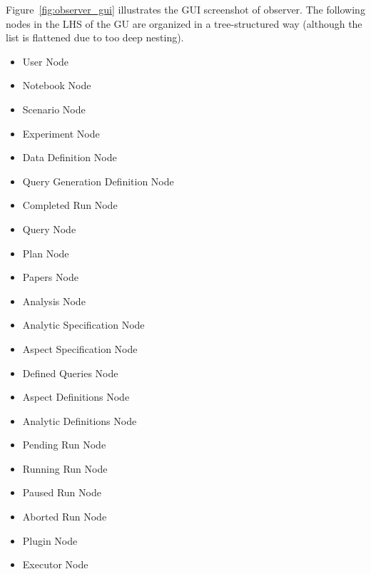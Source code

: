 \documentclass[conference]{IEEEtran}
\begin{document}
Figure~\ref{fig:observer_gui} illustrates the GUI screenshot of observer. 
The following nodes in the LHS of the GU are organized in a tree-structured way 
(although the list is flattened due to too deep nesting). 

\begin{itemize}
	\item User Node 

	\item Notebook Node

	\item Scenario Node

	\item Experiment Node 

	\item Data Definition Node

	\item Query Generation Definition Node

	\item Completed Run Node 

	\item Query Node

	\item Plan Node

	\item Papers Node
	
	\item Analysis Node
		
	\item Analytic Specification Node

	\item Aspect Specification Node

	\item Defined Queries Node	

	\item Aspect Definitions Node

	\item Analytic Definitions Node

	\item Pending Run Node

	\item Running Run Node

	\item Paused Run Node

	\item Aborted Run Node

	\item Plugin Node 

	\item Executor Node

\end{itemize}
\end{document}

